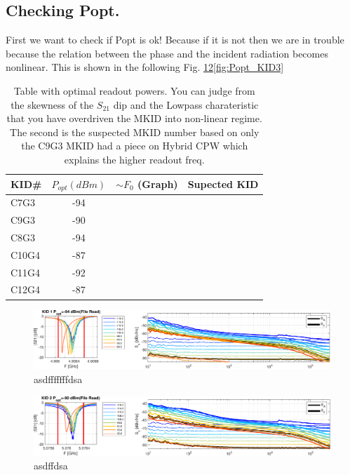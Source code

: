 \subsection*{Checking Popt.}
First we want to check if Popt is ok! Because if it is not then we are in trouble because the relation between the phase and the incident radiation becomes nonlinear.
This is shown in the following Fig. \ref{fig:Popt_KID1}\ref{fig:Popt_KID2}\ref{fig:Popt_KID3}
\begin{table}[ht]
    \centering
    \begin{tabular}[t]{lccc}
    \hline
    KID\# & $ P_{opt} (dBm) $ & $ \sim F_{0}$ (Graph) & Supected KID \\
    \hline
     C7G3  & -94  &\\
   	 C9G3  & -90  &\\
     C8G3  & -94  &\\
	 C10G4 & -87  & \\
     C11G4 & -92  & \\
     C12G4 & -87  & \\
    \hline
    \end{tabular}
    \caption{Table with optimal readout powers. You can judge from the skewness of the $S_{21}$ dip and the Lowpass charateristic that you have overdriven the MKID into non-linear regime. The second is the suspected MKID number based on only the C9G3 MKID had a piece on Hybrid CPW which explains the higher readout freq.}
    \label{tab:}
\end{table}%


\begin{figure}[h!!!!!]
	\centering
	\includegraphics[width=\linewidth]{figures/chA_Appendix/Popt_KID1.pdf}
	\caption{asdfffffffdsa}
	\label{fig:Popt_KID1}
\end{figure}

\begin{figure}[h!!!!!]
	\centering
	\includegraphics[width=\linewidth]{figures/chA_Appendix/Popt_KID2.pdf}
	\caption{asdffdsa}
	\label{fig:Popt_KID2}
\end{figure}

